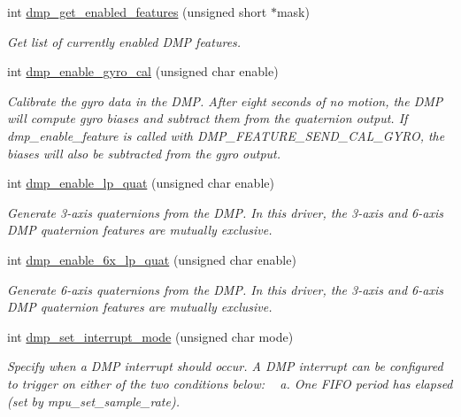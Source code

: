\begin{DoxyCompactItemize}
int \hyperlink{group___d_r_i_v_e_r_s_ga92b920b72f5146ea14d45ad2d529b64c}{dmp\+\_\+get\+\_\+enabled\+\_\+features} (unsigned short $\ast$mask)
\begin{DoxyCompactList}\small\item\em Get list of currently enabled D\+MP features. \end{DoxyCompactList}\item 
int \hyperlink{group___d_r_i_v_e_r_s_ga653ebcec6758f006dd89939e8f3c6ebb}{dmp\+\_\+enable\+\_\+gyro\+\_\+cal} (unsigned char enable)
\begin{DoxyCompactList}\small\item\em Calibrate the gyro data in the D\+MP. After eight seconds of no motion, the D\+MP will compute gyro biases and subtract them from the quaternion output. If {\itshape dmp\+\_\+enable\+\_\+feature} is called with {\itshape D\+M\+P\+\_\+\+F\+E\+A\+T\+U\+R\+E\+\_\+\+S\+E\+N\+D\+\_\+\+C\+A\+L\+\_\+\+G\+Y\+RO}, the biases will also be subtracted from the gyro output. \end{DoxyCompactList}\item 
int \hyperlink{group___d_r_i_v_e_r_s_ga4ee4339b79a58558d121ba8206056394}{dmp\+\_\+enable\+\_\+lp\+\_\+quat} (unsigned char enable)
\begin{DoxyCompactList}\small\item\em Generate 3-\/axis quaternions from the D\+MP. In this driver, the 3-\/axis and 6-\/axis D\+MP quaternion features are mutually exclusive. \end{DoxyCompactList}\item 
int \hyperlink{group___d_r_i_v_e_r_s_gaac712ef33727433f666b3861894873be}{dmp\+\_\+enable\+\_\+6x\+\_\+lp\+\_\+quat} (unsigned char enable)
\begin{DoxyCompactList}\small\item\em Generate 6-\/axis quaternions from the D\+MP. In this driver, the 3-\/axis and 6-\/axis D\+MP quaternion features are mutually exclusive. \end{DoxyCompactList}\item 
int \hyperlink{group___d_r_i_v_e_r_s_gaf10c08103d2aec9aa5555a5694bafced}{dmp\+\_\+set\+\_\+interrupt\+\_\+mode} (unsigned char mode)
\begin{DoxyCompactList}\small\item\em Specify when a D\+MP interrupt should occur. A D\+MP interrupt can be configured to trigger on either of the two conditions below\+: ~\newline
 a. One F\+I\+FO period has elapsed (set by {\itshape mpu\+\_\+set\+\_\+sample\+\_\+rate}). ~\newline

\end{DoxyCompactList}
\end{DoxyCompactItemize}
